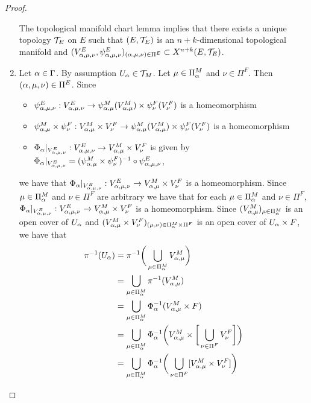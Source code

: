 \documentclass{book}
\begin{document}
\begin{proof}
\begin{enumerate}
\begin{itemize}
			\end{itemize}
			The topological manifold chart lemma implies that there exists a unique topology $\mathcal{T}_E$ on $E$ such that $(E, \mathcal{T}_E)$ is an $n+k$-dimensional topological manifold and $(V^E_{\alpha, \mu, \nu}, \psi^E_{\alpha, \mu, \nu})_{(\alpha, \mu, \nu) \in \Pi^E} \subset X^{n+k}(E, \mathcal{T}_E)$.
			\item Let $\alpha \in \Gamma$. By assumption $U_{\alpha} \in \mathcal{T}_M$. Let $\mu \in \Pi^M_{\alpha}$ and $\nu \in \Pi^F$. Then $(\alpha, \mu, \nu) \in \Pi^E$. Since 
			\begin{itemize}
				\item $\psi^E_{\alpha, \mu, \nu}: V^E_{\alpha, \mu, \nu} \rightarrow \psi^M_{\alpha, \mu}(V^M_{\alpha, \mu}) \times \psi^F_{\nu}(V^F_{\nu})$ is a homeomorphism
				\item $\psi^M_{\alpha, \mu} \times \psi^F_{\nu}: V^M_{\alpha, \mu} \times V^F_{\nu} \rightarrow \psi^M_{\alpha, \mu}(V^M_{\alpha, \mu}) \times \psi^F_{\nu}(V^F_{\nu})$ is a homeomorphism  
				\item $\Phi_{\alpha}|_{V^E_{\alpha, \mu, \nu}}: V^E_{\alpha, \mu, \nu} \rightarrow V^M_{\alpha, \mu} \times V^F_{\nu}$ is given by 
				$\Phi_{\alpha}|_{V^E_{\alpha, \mu, \nu}} =  (\psi^M_{\alpha, \mu} \times \psi^F_{\nu})^{-1} \circ \psi^E_{\alpha, \mu, \nu}$,
			\end{itemize}
			we have that $\Phi_{\alpha}|_{V^E_{\alpha, \mu, \nu}}: V^E_{\alpha, \mu, \nu} \rightarrow V^M_{\alpha, \mu} \times V^F_{\nu}$ is a homeomorphism. Since $\mu \in \Pi^M_{\alpha}$ and $\nu \in \Pi^F$ are arbitrary we have that for each $\mu \in \Pi^M_{\alpha}$ and $\nu \in \Pi^F$, $\Phi_{\alpha}|_{V^E_{\alpha, \mu, \nu}}: V^E_{\alpha, \mu, \nu} \rightarrow V^M_{\alpha, \mu} \times V^F_{\nu}$ is a homeomorphism. Since $(V^M_{\alpha, \mu})_{\mu \in \Pi^M_{\alpha}}$ is an open cover of $U_{\alpha}$ and $(V^M_{\alpha, \mu}\times V^F_{\nu})_{(\mu, \nu) \in \Pi^M_{\alpha} \times \Pi^F}$ is an open cover of $U_{\alpha} \times F$, we have that 
			\begin{align*}
				\pi^{-1}(U_{\al})
				& = \pi^{-1}\bigg( \bigcup_{\mu \in \Pi^M_{\al}} V^M_{\al, \mu} \bigg) \\
				& = \bigcup_{\mu \in \Pi^M_{\al}} \pi^{-1}(V^M_{\al, \mu}) \\
				& = \bigcup_{\mu \in \Pi^M_{\al}} \Phi_{\al}^{-1}(V^M_{\al, \mu} \times F) \\
				& = \bigcup_{\mu \in \Pi^M_{\al}} \Phi_{\al}^{-1} \bigg( V^M_{\al, \mu} \times \bigg[ \bigcup_{\nu \in \Pi^F} V^F_{\nu} \bigg] \bigg) \\
				& = \bigcup_{\mu \in \Pi^M_{\al}} \Phi_{\al}^{-1} \bigg(  \bigcup_{\nu \in \Pi^F} [V^M_{\al, \mu} \times V^F_{\nu} ] \bigg) \\

\end{align*}
\end{enumerate}
\end{proof}
\end{document}
